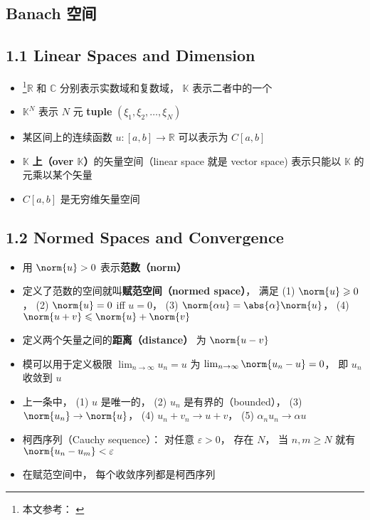 
\subsection{Banach 空间}

\subsection{1.1 Linear Spaces and Dimension}
\begin{itemize}
\item \footnote{本文参考： \cite{Zeidler}}$\mathbb R$ 和 $\mathbb C$ 分别表示实数域和复数域， $\mathbb K$ 表示二者中的一个

\item $\mathbb K^N$ 表示 $N$ 元 \textbf{tuple} $(\xi_1, \xi_2, \dots, \xi_N)$

\item 某区间上的连续函数 $u:[a, b] \to \mathbb{R}$ 可以表示为 $C[a, b]$

\item $\mathbb{K}$ \textbf{上（over $\mathbb K$）}的矢量空间（linear space 就是 vector space) 表示只能以 $\mathbb K$ 的元乘以某个矢量

\item $C[a, b]$ 是无穷维矢量空间
\end{itemize}

\subsection{1.2 Normed Spaces and Convergence}
\begin{itemize}
\item 用 $\norm{u} > 0$ 表示\textbf{范数（norm）}

\item 定义了范数的空间就叫\textbf{赋范空间（normed space）}， 满足 (1) $\norm{u} \geqslant 0$， (2) $\norm{u} = 0$ iff $u = 0$， (3) $\norm{\alpha u} = \abs{\alpha} \norm{u}$， (4) $\norm{u + v} \leqslant \norm{u} + \norm{v}$

\item 定义两个矢量之间的\textbf{距离（distance）} 为 $\norm{u - v}$

\item 模可以用于定义极限 $\lim_{n\to\infty} u_n = u$ 为 $\lim_{n\to\infty} \norm{u_n - u} = 0$， 即 $u_n$ 收敛到 $u$

\item 上一条中， (1) $u$ 是唯一的， (2) $u_n$ 是有界的（bounded）， (3) $\norm{u_n} \to \norm{u}$， (4) $u_n + v_n \to u + v$， (5) $\alpha_n u_n \to \alpha u$

\item 柯西序列（Cauchy sequence）： 对任意 $\varepsilon > 0$， 存在 $N$， 当 $n, m \geqslant N$ 就有 $\norm{u_n - u_m} < \varepsilon$

\item 在赋范空间中， 每个收敛序列都是柯西序列
\end{itemize}

